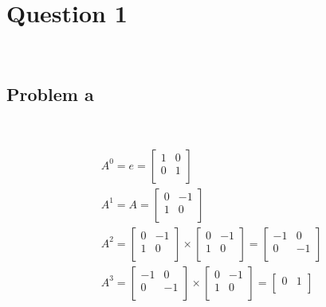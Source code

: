 \documentclass{article}
\begin{document}
\section*{Question 1}

~

\subsection*{Problem a}

~

\begin{equation*}
    \begin{split}
        &A^0=e=\begin{bmatrix}
            1&0\\
            0&1\\
        \end{bmatrix}\\
        &A^1=A=\begin{bmatrix}
            0&-1\\
            1&0\\
        \end{bmatrix}\\
        &A^2=\begin{bmatrix}
            0&-1\\
            1&0\\
        \end{bmatrix}\times\begin{bmatrix}
            0&-1\\
            1&0\\
        \end{bmatrix}=\begin{bmatrix}
            -1&0\\
            0&-1\\
        \end{bmatrix}\\
        &A^3=\begin{bmatrix}
            -1&0\\
            0&-1\\
        \end{bmatrix}\times\begin{bmatrix}
            0&-1\\
            1&0\\
        \end{bmatrix}=\begin{bmatrix}
            0&1\\

\end{bmatrix}
\end{split}
\end{equation*}
\end{document}
